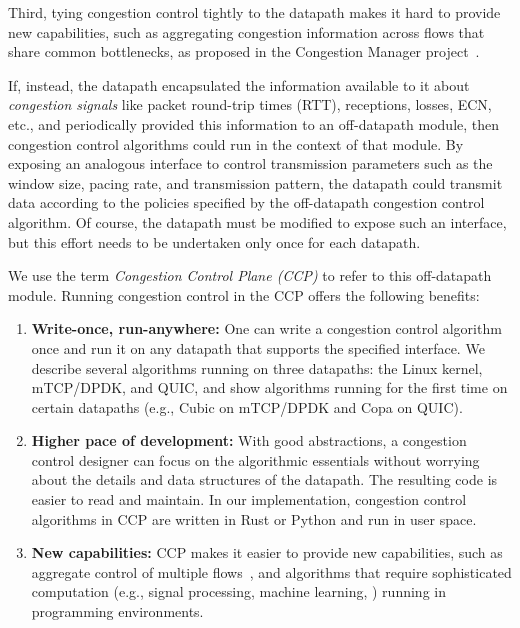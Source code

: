 Third, tying congestion control tightly to the datapath makes it hard to provide new capabilities, such as aggregating congestion information across flows that share common bottlenecks, as proposed in the Congestion Manager project~\cite{cm}. 


\smallskip
If, instead, the datapath encapsulated the information available to it about {\em congestion signals} like packet round-trip times (RTT), receptions, losses, ECN, etc., and periodically provided this information to an off-datapath module, then congestion control algorithms could run in the context of that module. 
By exposing an analogous interface to control transmission parameters such as the window size, pacing rate, and transmission pattern, the datapath could transmit data according to the policies specified by the off-datapath congestion control algorithm. Of course, the datapath must be modified to expose
such an interface, but this effort needs to be undertaken only once for each datapath.

We use the term {\em Congestion Control Plane (CCP)} to refer to this off-datapath module. Running congestion control in the CCP offers the following benefits:
\begin{enumerate}
    \item {\bf Write-once, run-anywhere:} One can write a congestion control algorithm once and run it on any datapath that supports the specified interface. 
    We describe several algorithms running on three datapaths: the Linux kernel, mTCP/DPDK, and QUIC, and show algorithms running for the first time on certain datapaths (e.g., Cubic on mTCP/DPDK and Copa on QUIC).
    \item {\bf Higher pace of development:} With good abstractions,
      a congestion control designer can focus on the algorithmic essentials
      without worrying about the details and data structures of the
      datapath. The resulting code is easier to read and maintain. In our implementation, congestion control algorithms in CCP are written in Rust or Python and run in user space. 
    \item {\bf New capabilities:} CCP makes it easier to provide new
      capabilities, such as aggregate control of multiple flows~\cite{cm}, and algorithms that require sophisticated computation (e.g., signal processing, machine learning, \etc) running in \userspace programming environments. 
\end{enumerate}


